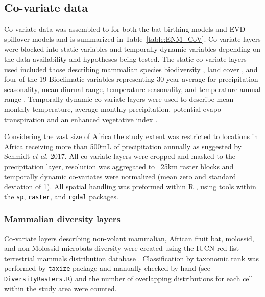 \documentclass[9pt,twoside,lineno]{pnas-new}
\begin{document}
\subsection*{Co-variate data}
\label{CoV}
Co-variate data was assembled to for both the bat birthing models and EVD spillover models and is summarized in Table~\ref{table:ENM_CoV}. Co-variate layers were blocked into static variables and temporally dynamic variables depending on the data availability and hypotheses being tested. The static co-variate layers used included those describing mammalian species biodiversity \cite{IUCN2016TerrestrialData}, land cover \cite{Olivier2012Global2009}, and four of the 19 Bioclimatic variables representing 30 year average for precipitation seasonality, mean diurnal range, temperature seasonality, and temperature annual range \cite{Frick2017WorldclimArease}. Temporally dynamic co-variate layers were used to describe mean monthly temperature, average monthly precipitation, potential evapo-transpiration \cite{Trabucco2009GlobalDatabase} and an enhanced vegetative index \cite{Huete2002OverviewIndices}.\par
Considering the vast size of Africa the study extent was restricted to locations in Africa receiving more than 500mL of precipitation annually as suggested by Schmidt \textit{et al.} 2017\cite{Schmidt2017SpatiotemporalSpillover}. All co-variate layers were cropped and  masked to the precipitation layer, resolution was aggregated to ~25km raster blocks and temporally dynamic co-variates were normalized (mean zero and standard deviation of 1). All spatial handling was preformed within R \cite{Team2017R:Computing}, using tools within the \texttt{sp}\cite{Pebesma2005ClassesR}, \texttt{raster}\cite{Hijmans2016Raster:Modeling}, and \texttt{rgdal}\cite{Bivand2017Rgdal:Library} packages.\par
\subsubsection*{Mammalian diversity layers}
Co-variate layers describing non-volant mammalian, African fruit bat, molossid, and non-Molossid microbats diversity were created using the IUCN red list terrestrial mammals distribution database \cite{IUCN2016TerrestrialData}. Classification by taxonomic rank was performed by \texttt{taxize} package \cite{Chamberlain2013Taxize:R} and manually checked by hand (see \texttt{DiversityRasters.R}) and the number of overlapping distributions for each cell within the study area were counted.\par
\end{document}
